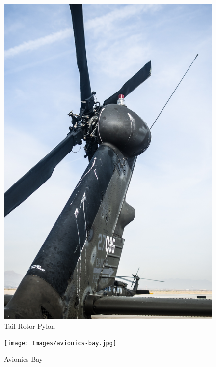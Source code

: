 \begin{figure}[htp]
\includegraphics[width=\textwidth]{Images/v-tail-pylon-overview.jpg}
\caption{Tail Rotor Pylon} \label{trpylon}
\end{figure}
\begin{figure}[htp]
\texttt{[image: Images/avionics-bay.jpg]}
\caption{Avionics Bay} \label{avionics}
\end{figure}
